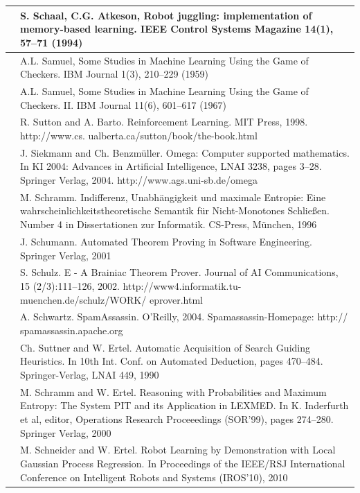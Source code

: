 \documentclass[10pt]{book}
\begin{document}
\begin{tabular}{|l|l|}
\hline [SA94] & S. Schaal, C.G. Atkeson, Robot juggling: implementation of memory-based learning. IEEE Control Systems Magazine 14(1), 57--71 (1994) \\
\hline [Sam59] & A.L. Samuel, Some Studies in Machine Learning Using the Game of Checkers. IBM Journal 1(3), 210--229 (1959) \\
\hline [\cite{samuel1967checkers2}] & A.L. Samuel, Some Studies in Machine Learning Using the Game of Checkers. II. IBM Journal 11(6), 601--617 (1967) \\
\hline [SB98] & R. Sutton and A. Barto. Reinforcement Learning. MIT Press, 1998. http://www.cs. ualberta.ca/sutton/book/the-book.html \\
\hline [SB04] & J. Siekmann and Ch. Benzmüller. Omega: Computer supported mathematics. In KI 2004: Advances in Artificial Intelligence, LNAI 3238, pages 3--28. Springer Verlag, 2004. http://www.ags.uni-sb.de/omega \\
\hline [Sch96] & M. Schramm. Indifferenz, Unabhängigkeit und maximale Entropie: Eine wahrscheinlichkeitstheoretische Semantik für Nicht-Monotones Schließen. Number 4 in Dissertationen zur Informatik. CS-Press, München, 1996 \\
\hline [Sch01] & J. Schumann. Automated Theorem Proving in Software Engineering. Springer Verlag, 2001 \\
\hline [Sch02] & S. Schulz. E - A Brainiac Theorem Prover. Journal of AI Communications, 15 (2/3):111--126, 2002. http://www4.informatik.tu-muenchen.de/schulz/WORK/ eprover.html \\
\hline [Sch04] & A. Schwartz. SpamAssassin. O'Reilly, 2004. Spamassassin-Homepage: http:// spamassassin.apache.org \\
\hline [SE90] & Ch. Suttner and W. Ertel. Automatic Acquisition of Search Guiding Heuristics. In 10th Int. Conf. on Automated Deduction, pages 470--484. Springer-Verlag, LNAI 449, 1990 \\
\hline [SE00] & M. Schramm and W. Ertel. Reasoning with Probabilities and Maximum Entropy: The System PIT and its Application in LEXMED. In K. Inderfurth et al, editor, Operations Research Proceeedings (SOR'99), pages 274--280. Springer Verlag, 2000 \\
\hline [SE10] & M. Schneider and W. Ertel. Robot Learning by Demonstration with Local Gaussian Process Regression. In Proceedings of the IEEE/RSJ International Conference on Intelligent Robots and Systems (IROS'10), 2010 \\

\end{tabular}
\end{document}
